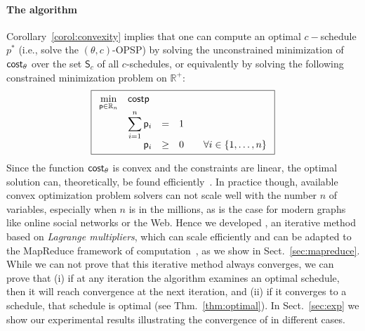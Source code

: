 \paragraph{The algorithm}
Corollary~\ref{corol:convexity} implies that one can compute an optimal
$c-$schedule $p^*$ (i.e., solve the $(\theta,c)$-OPSP) by solving the
unconstrained minimization of $\mathsf{cost}_\theta$ over the set $\mathsf{S}_c$ of all
$c$-schedules, or equivalently by solving the following constrained minimization
problem on $\mathbb{R}^+$:
\begin{equation}\label{eq:optimization}
	\boxed{
	\begin{array}{rrclcl}
	\displaystyle \min_{\sched\in\mathbb{R}_n} & \multicolumn{3}{l}{\cost{\sched}} \\
	&\displaystyle \sum_{i=1}^{n} \sched_i & = & 1 \\
	&\sched_i & \geq & 0 & & \forall i \in \{1,\ldots,n\} \\
	\end{array} }
\end{equation}
Since the function $\mathsf{cost}_\theta$ is convex and the constraints are linear, the
optimal solution can, theoretically, be found efficiently~\citep{BoydV04}. In
practice though, available convex optimization problem solvers can not scale
well with the number $n$ of variables, especially when $n$ is in the millions,
as is the case for modern graphs like online social networks or the Web. Hence
we developed \algoname, an iterative method based on \emph{Lagrange
multipliers}\citemissing, which can scale efficiently and can be adapted to the
MapReduce framework of computation~\citep{dean2008mapreduce}, as we show in
Sect.~\ref{sec:mapreduce}.
While we can not prove that this iterative method
always converges, we can prove that (i) if at any iteration the algorithm
examines an optimal schedule, then it will reach convergence at the next
iteration, and (ii) if it converges to a schedule, that schedule is optimal (see
Thm.~\ref{thm:optimal}). In Sect.~\ref{sec:exp} we show our experimental results
illustrating the convergence of \algoname in different cases.

